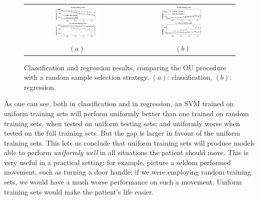 \begin{figure}[!ht] \centering
  \begin{tabular}{cc}
    \includegraphics[width=0.45\textwidth]{figs/fig_rnVSuni1.png} &
    \includegraphics[width=0.45\textwidth]{figs/fig_rnVSuni2.png} \\
    $(a)$ & $(b)$ \\
  \end{tabular}
  \caption{Classification and regression results, comparing the OU
  procedure with a random sample selection strategy. $(a)$:
    classification, $(b)$: regression.}
  \label{fig:rnVSuni}
\end{figure}

As one can see, both in classification and in regression, an SVM
trained on uniform training sets will perform uniformly better than
one trained on random training sets, when tested on uniform testing
sets; and uniformly worse when tested on the full training sets. But
the gap is larger in favour of the uniform training sets. This lets us
conclude that uniform training sets will produce models able to
perform \emph{uniformly well} in all situations the patient should
move. This is very useful in a practical setting: for example, picture
a seldom performed movement, such as turning a door handle; if we were
employing random training sets, we would have a much worse performance
on such a movement. Uniform training sets would make the patient's
life easier.
